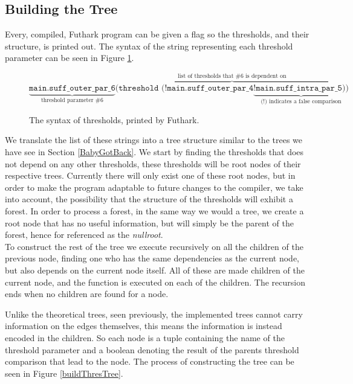 \subsection{Building the Tree}
Every, compiled, Futhark program can be given a flag so the thresholds, and their structure, is printed out. The syntax of the string representing each threshold parameter
can be seen in Figure \ref{thresholdSyntax}.
\begin{figure}[h]
	$$\underbrace{\texttt{main.suff\_outer\_par\_6}}_\text{threshold parameter \#6} \overbrace{\texttt{(threshold (!main.suff\_outer\_par\_4} \underbrace{\texttt{!main.suff\_intra\_par\_5))}}_\text{(!) indicates a false comparison}}^\text{list of thresholds that \#6 is dependent on}$$
	\caption{The syntax of thresholds, printed by Futhark.}
	\label{thresholdSyntax}
\end{figure}
We translate the list of these strings into a tree structure similar to the
trees we have see in Section \ref{BabyGotBack}. 
We start by finding the thresholds that does not depend on any other thresholds, 
these thresholds will be root nodes of their respective trees.
Currently there will only exist one of these root nodes, but in order to make the program
adaptable to future changes to the compiler, we take into account, the possibility that the
structure of the thresholds will exhibit a forest. In order to process a forest, in the same way we would a tree, 
we create a root node that has no useful information, but will simply be the
parent of the forest, hence for referenced as the \textit{nullroot}. \\

To construct the rest of the tree we execute recursively on all the children
of the previous node, finding one who has the same dependencies as the current
node, but also depends on the current node itself. All of these are made
children of the current node, and the function is executed on each of the children. The
recursion ends when no children are found for a node.

Unlike the theoretical trees, seen previously, the implemented trees cannot carry information on
the edges themselves, this means the information is instead encoded in the
children. So each node is a tuple containing the name of the threshold
parameter and a boolean denoting the result of the parents threshold
comparison that lead to the node. The process of constructing the tree can be seen in Figure \ref{buildThresTree}.


